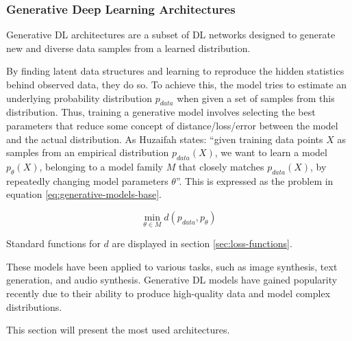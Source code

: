 \subsubsection{Generative Deep Learning Architectures}

Generative \ac{DL} architectures are a subset of \ac{DL} networks designed to generate new and diverse data samples from a learned distribution.

By finding latent data structures and learning to reproduce the hidden statistics behind observed data, they do so. To achieve this, the model tries to estimate an underlying probability distribution $p_{data}$ when given a set of samples from this distribution. Thus, training a generative model involves selecting the best parameters that reduce some concept of distance/loss/error between the model and the actual distribution. As Huzaifah \cite{huzaifah_deep_2021} states: ``given training data points $X$ as samples from an empirical distribution $p_{data}(X)$, we want to learn a model $p_\theta(X)$, belonging to a model family $M$ that closely matches $p_{data}(X)$, by repeatedly changing model parameters $\theta$''. This is expressed as the problem in equation \ref{eq:generative-models-base}.

\begin{equation} \label{eq:generative-models-base}
    \min_{\theta \in M} d (p_{data}, p_\theta)
\end{equation}

Standard functions for $d$ are displayed in section \ref{sec:loss-functions}.

These models have been applied to various tasks, such as image synthesis, text generation, and audio synthesis. Generative \ac{DL} models have gained popularity recently due to their ability to produce high-quality data and model complex distributions.

This section will present the most used architectures.








